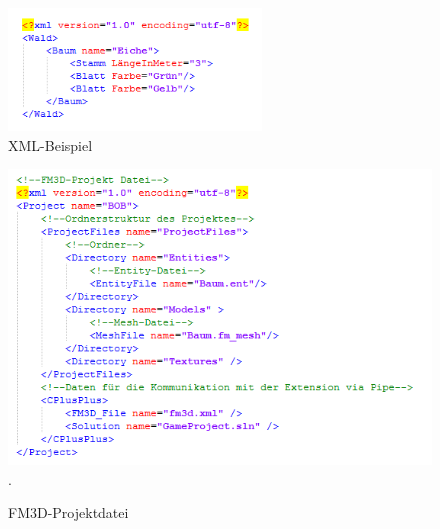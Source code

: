 \begin{figure}
	\begin{center}
		\includegraphics[width=0.6\textwidth]{03unserprogramm/Designer/xmlbsp.png}
		\caption{XML-Beispiel}\label{xmlbsp}
	\end{center}
\end{figure}
\begin{figure}
	\begin{center}
		\includegraphics[width=\textwidth]{03unserprogramm/Designer/FM3DProjektdatei.PNG}.
		\caption{FM3D-Projektdatei}\label{fm3dprojekt}
	\end{center}
\end{figure}
